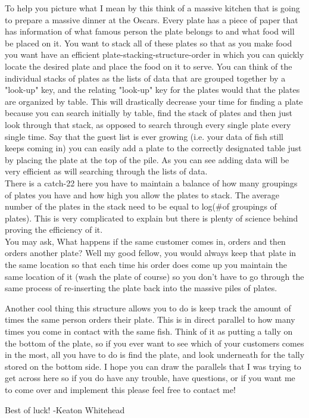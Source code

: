 \documentclass[12pt]{article}
\begin{document}
To help you picture what I mean by this think of a massive kitchen that is going to prepare a massive dinner at the Oscars. Every plate has a piece of paper that has information of what famous person the plate belongs to and what food will be placed on it. You want to stack all of these plates so that as you make food you want have an efficient plate-stacking-structure-order in which you can quickly locate the desired plate and place the food on it to serve. You can think of the individual stacks of plates as the lists of data that are grouped together by a "look-up" key, and the relating "look-up" key for the plates would that the plates are organized by table. This will drastically decrease your time for finding a plate because you can search initially by table, find the stack of plates and then just look through that stack, as opposed to search through every single plate every single time. Say that the guest list is ever growing (i.e. your data of fish still keeps coming in) you can easily add a plate to the correctly designated table just by placing the plate at the top of the pile. As you can see adding data will be very efficient as will searching through the lists of data. \\

There is a catch-22 here you have to maintain a balance of how many groupings of plates you have and how high you allow the plates to stack. The average number of the plates in the stack need to be equal to log(#of groupings of plates). This is very complicated to explain but there is plenty of science behind proving the efficiency of it.\\

You may ask, What happens if the same customer comes in, orders and then orders another plate? Well my good fellow, you would always keep that plate in the same location so that each time his order does come up you maintain the same location of it (wash the plate of course) so you don't have to go through the same process of re-inserting the plate back into the massive piles of plates. 

Another cool thing this structure allows you to do is keep track the amount of times the same person orders their plate. This is in direct parallel to how many times you come in contact with the same fish. Think of it as putting a tally on the bottom of the plate, so if you ever want to see which of your customers comes in the most, all you have to do is find the plate, and look underneath for the tally stored on the bottom side. I hope you can draw the parallels that I was trying to get across here so if you do have any trouble, have questions, or if you want me to come over and implement this please feel free to contact me!

Best of luck!
-Keaton Whitehead
\pagebreak
\end{document}
